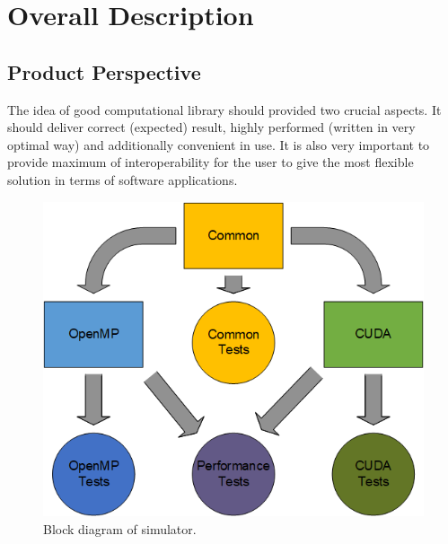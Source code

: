 
\chapter{Overall Description} \label{chp:overall-description}

\section{Product Perspective}

	The idea of good computational library should provided two crucial aspects. It should deliver correct (expected) result, highly performed (written in very optimal way) and additionally convenient in use. It is also very important to provide maximum of interoperability for the user to give the most flexible solution in terms of software applications.
	\begin{figure} 
		\centering
		\includegraphics[scale=0.5]{img/overall-diagram}
		\caption{Block diagram of simulator.}
		\label{fig:block-diagram-of-library}
	\end{figure}

